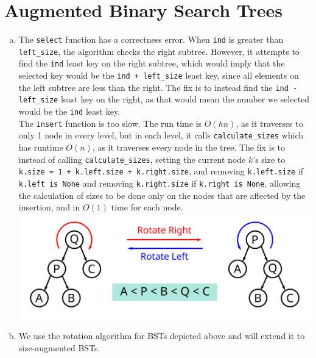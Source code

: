 \documentclass[11pt]{scrartcl}
\theoremstyle{dotlessP}
\theoremstyle{dotlessN}
\begin{document}
\section{Augmented Binary Search Trees}
\begin{enumerate}[(a)]
	\item The \texttt{select} function has a correctness error. When \texttt{ind} is greater than \texttt{left\_size}, the algorithm checks the right subtree. However, it attempts to find the \texttt{ind} least key on the right subtree, which would imply that the selected key would be the \texttt{ind + left\_size} least key, since all elements on the left subtree are less than the right. The fix is to instead find the \texttt{ind - left\_size} least key on the right, as that would mean the number we selected would be the \texttt{ind} least key.
		\\

		The \texttt{insert} function is too slow. The run time is $O(hn)$, as it traverses to only 1 node in every level, but in each level, it calls \texttt{calculate\_sizes} which has runtime $O(n)$, as it traverses every node in the tree. The fix is to instead of calling \texttt{calculate\_sizes}, setting the current node $k$'s size to  \texttt{k.size = 1 + k.left.size + k.right.size}, and removing \texttt{k.left.size} if \texttt{k.left is None} and removing \texttt{k.right.size} if \texttt{k.right is None}, allowing the calculation of sizes to be done only on the nodes that are affected by the insertion, and in $O(1)$ time for each node. 
		\includegraphics[width=\textwidth]{Tree_rotation}
	\item We use the rotation algorithm for BSTs depicted above and will extend it to size-augmented BSTs.
		\\


\end{enumerate}
\end{document}
